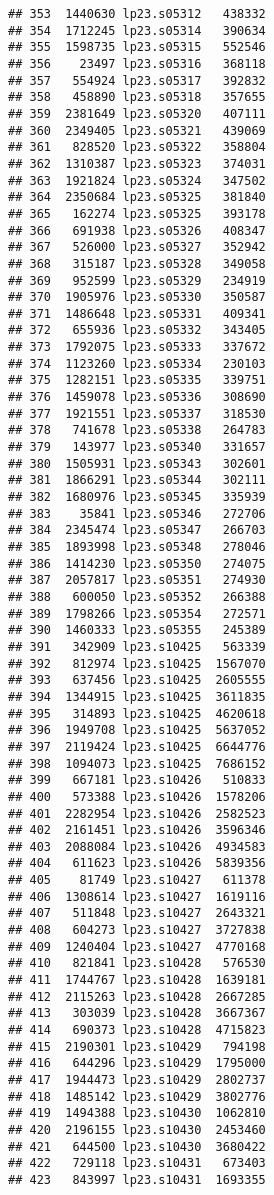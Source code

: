 \documentclass[
]{article}
\begin{document}
\begin{verbatim}
## 353  1440630 lp23.s05312   438332
## 354  1712245 lp23.s05314   390634
## 355  1598735 lp23.s05315   552546
## 356    23497 lp23.s05316   368118
## 357   554924 lp23.s05317   392832
## 358   458890 lp23.s05318   357655
## 359  2381649 lp23.s05320   407111
## 360  2349405 lp23.s05321   439069
## 361   828520 lp23.s05322   358804
## 362  1310387 lp23.s05323   374031
## 363  1921824 lp23.s05324   347502
## 364  2350684 lp23.s05325   381840
## 365   162274 lp23.s05325   393178
## 366   691938 lp23.s05326   408347
## 367   526000 lp23.s05327   352942
## 368   315187 lp23.s05328   349058
## 369   952599 lp23.s05329   234919
## 370  1905976 lp23.s05330   350587
## 371  1486648 lp23.s05331   409341
## 372   655936 lp23.s05332   343405
## 373  1792075 lp23.s05333   337672
## 374  1123260 lp23.s05334   230103
## 375  1282151 lp23.s05335   339751
## 376  1459078 lp23.s05336   308690
## 377  1921551 lp23.s05337   318530
## 378   741678 lp23.s05338   264783
## 379   143977 lp23.s05340   331657
## 380  1505931 lp23.s05343   302601
## 381  1866291 lp23.s05344   302111
## 382  1680976 lp23.s05345   335939
## 383    35841 lp23.s05346   272706
## 384  2345474 lp23.s05347   266703
## 385  1893998 lp23.s05348   278046
## 386  1414230 lp23.s05350   274075
## 387  2057817 lp23.s05351   274930
## 388   600050 lp23.s05352   266388
## 389  1798266 lp23.s05354   272571
## 390  1460333 lp23.s05355   245389
## 391   342909 lp23.s10425   563339
## 392   812974 lp23.s10425  1567070
## 393   637456 lp23.s10425  2605555
## 394  1344915 lp23.s10425  3611835
## 395   314893 lp23.s10425  4620618
## 396  1949708 lp23.s10425  5637052
## 397  2119424 lp23.s10425  6644776
## 398  1094073 lp23.s10425  7686152
## 399   667181 lp23.s10426   510833
## 400   573388 lp23.s10426  1578206
## 401  2282954 lp23.s10426  2582523
## 402  2161451 lp23.s10426  3596346
## 403  2088084 lp23.s10426  4934583
## 404   611623 lp23.s10426  5839356
## 405    81749 lp23.s10427   611378
## 406  1308614 lp23.s10427  1619116
## 407   511848 lp23.s10427  2643321
## 408   604273 lp23.s10427  3727838
## 409  1240404 lp23.s10427  4770168
## 410   821841 lp23.s10428   576530
## 411  1744767 lp23.s10428  1639181
## 412  2115263 lp23.s10428  2667285
## 413   303039 lp23.s10428  3667367
## 414   690373 lp23.s10428  4715823
## 415  2190301 lp23.s10429   794198
## 416   644296 lp23.s10429  1795000
## 417  1944473 lp23.s10429  2802737
## 418  1485142 lp23.s10429  3802776
## 419  1494388 lp23.s10430  1062810
## 420  2196155 lp23.s10430  2453460
## 421   644500 lp23.s10430  3680422
## 422   729118 lp23.s10431   673403
## 423   843997 lp23.s10431  1693355

\end{verbatim}
\end{document}
